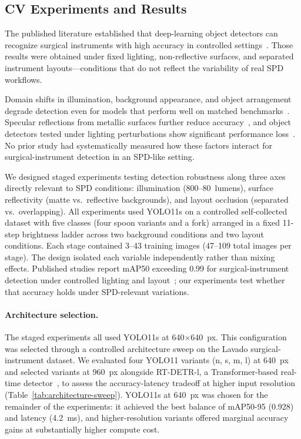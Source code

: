 \documentclass[10pt,a4paper]{article}
\begin{document}
\subsection{CV Experiments and Results}
\label{sec:computer-vision-experiments}

The published literature established that deep-learning object detectors
can recognize surgical instruments with high accuracy in controlled
settings~\cite{deol-et-al-2024, atabuzzaman-et-al-2025}. Those results
were obtained under fixed lighting, non-reflective surfaces, and separated
instrument layouts---conditions that do not reflect the variability of
real SPD workflows.

Domain shifts in illumination, background appearance, and object
arrangement degrade detection even for models that perform well on matched
benchmarks~\cite{ahmed-et-al-2021, yang-et-al-2024}. Specular reflections
from metallic surfaces further reduce
accuracy~\cite{jayasinghe-et-al-2023, wang-et-al-2016, wei-et-al-2018}, and
object detectors tested under lighting perturbations show significant
performance loss~\cite{premakumara-et-al-2023}. No prior study had
systematically measured how these factors interact for surgical-instrument
detection in an SPD-like setting.

We designed staged experiments testing detection robustness along three
axes directly relevant to SPD conditions: illumination (800--80~lumens),
surface reflectivity (matte vs.\ reflective backgrounds), and layout
occlusion (separated vs.\ overlapping). All experiments used YOLO11s on a
controlled self-collected dataset with five classes (four spoon variants and a fork) arranged in a fixed 11-step brightness ladder across two
background conditions and two layout conditions. Each stage contained 3--43
training images (47--109 total images per stage). The design isolated each
variable independently rather than mixing effects. Published studies report
mAP50 exceeding 0.99 for surgical-instrument detection under controlled
lighting and layout~\cite{deol-et-al-2024, atabuzzaman-et-al-2025}; our
experiments test whether that accuracy holds under SPD-relevant variations.
\paragraph{Architecture selection.}
The staged experiments all used YOLO11s at 640$\times$640~px. This
configuration was selected through a controlled architecture sweep on the
Lavado surgical-instrument dataset. We evaluated four YOLO11 variants (n,
s, m, l) at 640~px and selected variants at 960~px alongside RT-DETR-l, a
Transformer-based real-time detector~\cite{zhao-et-al-2024-rtdetr}, to
assess the accuracy-latency tradeoff at higher input resolution
(Table~\ref{tab:architecture-sweep}). YOLO11s at 640~px was chosen for the
remainder of the experiments: it achieved the best balance of mAP50-95
(0.928) and latency (4.2~ms), and higher-resolution variants offered
marginal accuracy gains at substantially higher compute cost.
\end{document}
